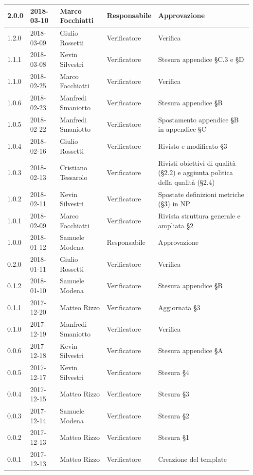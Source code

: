 \documentclass[openany,12pt,a4paper]{report}
\begin{document}
\begin{longtable}{|p{20mm}|p{20mm}|p{40mm}|p{30mm}|p{50mm}|}
		2.0.0 & 2018-03-10 & Marco Focchiatti & Responsabile & Approvazione \\
		\hline 1.2.0 & 2018-03-09 & Giulio Rossetti & Verificatore & Verifica \\
		\hline 1.1.1 & 2018-03-08 & Kevin Silvestri & Verificatore & Stesura appendice §C.3 e §D  \\
		\hline 1.1.0 & 2018-02-25 & Marco Focchiatti & Verificatore & Verifica \\
		\hline 1.0.6 & 2018-02-23 & Manfredi Smaniotto & Verificatore & Stesura appendice §B \\
		\hline 1.0.5 & 2018-02-22 & Manfredi Smaniotto & Verificatore & Spostamento appendice §B in appendice §C \\
		\hline 1.0.4 & 2018-02-16 & Giulio Rossetti & Verificatore & Rivisto e modificato §3 \\
		\hline 1.0.3 & 2018-02-13 & Cristiano Tessarolo & Verificatore & Rivisti obiettivi di qualità (§2.2) e aggiunta politica della qualità (§2.4) \\
		\hline 1.0.2 & 2018-02-11 & Kevin Silvestri & Verificatore & Spostate definizioni metriche (§3) in NP\\
		\hline 1.0.1 & 2018-02-09 & Marco Focchiatti & Verificatore & Rivista struttura generale e ampliata §2 \\
		
		\hline
		 
		1.0.0 & 2018-01-12 & Samuele Modena & Responsabile & Approvazione \\
		\hline 0.2.0 & 2018-01-11 & Giulio Rossetti & Verificatore & Verifica \\
		\hline 0.1.2 & 2018-01-10 & Samuele Modena & Verificatore & Stesura appendice §B \\
		\hline 0.1.1 & 2017-12-20 & Matteo Rizzo & Verificatore & Aggiornata §3 \\
		\hline 0.1.0 & 2017-12-19 & Manfredi Smaniotto & Verificatore & Verifica \\		
		\hline 0.0.6 & 2017-12-18 & Kevin Silvestri & Verificatore & Stesura appendice §A \\
		\hline 0.0.5 & 2017-12-17 & Kevin Silvestri & Verificatore & Stesura §4 \\	
		\hline 0.0.4 & 2017-12-15 & Matteo Rizzo & Verificatore & Stesura §3 \\
		\hline 0.0.3 & 2017-12-14 & Samuele Modena & Verificatore & Stesura §2 \\
		\hline 0.0.2 & 2017-12-13 & Matteo Rizzo & Verificatore & Stesura §1 \\
		\hline 0.0.1 & 2017-12-13 & Matteo Rizzo & Verificatore & Creazione del template \\
		\hline
		
	\end{longtable}
\end{document}
